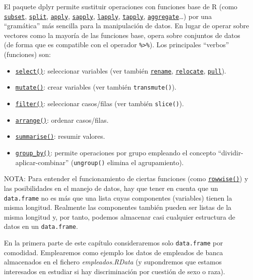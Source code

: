 \documentclass[
]{book}
\theoremstyle{break}
\theoremstyle{nonumberplain}
\begin{document}
El paquete dplyr permite sustituir operaciones con funciones base de R (como \href{NA}{\texttt{subset}}, \href{NA}{\texttt{split}}, \href{NA}{\texttt{apply}}, \href{NA}{\texttt{sapply}}, \href{NA}{\texttt{lapply}}, \href{NA}{\texttt{tapply}}, \href{NA}{\texttt{aggregate}}\ldots) por una ``gramática'' más sencilla para la manipulación de datos.
En lugar de operar sobre vectores como la mayoría de las funciones base,
opera sobre conjuntos de datos (de forma que es compatible con el operador \texttt{\%\textgreater{}\%}).
Los principales ``verbos'' (funciones) son:

\begin{itemize}
\item
  \href{https://dplyr.tidyverse.org/reference/select.html}{\texttt{select()}}: seleccionar variables (ver también \href{https://dplyr.tidyverse.org/reference/rename.html}{\texttt{rename}}, \href{https://dplyr.tidyverse.org/reference/rename.html}{\texttt{relocate}}, \href{https://dplyr.tidyverse.org/reference/rename.html}{\texttt{pull}}).
\item
  \href{https://dplyr.tidyverse.org/reference/mutate.html}{\texttt{mutate()}}: crear variables (ver también \texttt{transmute()}).
\item
  \href{https://dplyr.tidyverse.org/reference/filter.html}{\texttt{filter()}}: seleccionar casos/filas (ver también \texttt{slice()}).
\item
  \href{https://dplyr.tidyverse.org/reference/arrange.html}{\texttt{arrange()}}: ordenar casos/filas.
\item
  \href{https://dplyr.tidyverse.org/reference/summarise.html}{\texttt{summarise()}}: resumir valores.
\item
  \href{https://dplyr.tidyverse.org/reference/group_by.html}{\texttt{group\_by()}}: permite operaciones por grupo empleando el concepto ``dividir-aplicar-combinar'' (\texttt{ungroup()} elimina el agrupamiento).
\end{itemize}

NOTA: Para entender el funcionamiento de ciertas funciones (como \href{https://dplyr.tidyverse.org/reference/rowwise.html}{\texttt{rowwise()}}) y las posibilidades en el manejo de datos, hay que tener en cuenta que un \texttt{data.frame} no es más que una lista cuyas componentes (variables) tienen la misma longitud.
Realmente las componentes también pueden ser listas de la misma longitud y, por tanto, podemos almacenar casi cualquier estructura de datos en un \texttt{data.frame}.

En la primera parte de este capítulo consideraremos solo \texttt{data.frame} por comodidad.
Emplearemos como ejemplo los datos de empleados de banca almacenados en el fichero \emph{empleados.RData} (y supondremos que estamos interesados en estudiar si hay discriminación por cuestión de sexo o raza).
\end{document}
